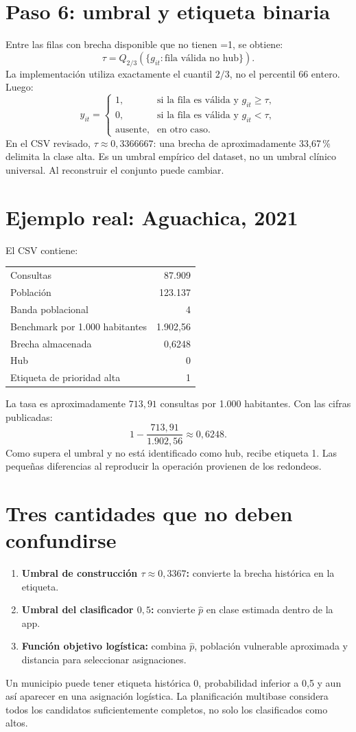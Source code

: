 \documentclass[11pt,a4paper]{report}
\newcommand{\campo}[1]{\texttt{\detokenize{#1}}}
\begin{document}
\section{Paso 6: umbral y etiqueta binaria}
Entre las filas con brecha disponible que no tienen \campo{es_hub}=1, se obtiene:
\[
\tau=Q_{2/3}(\{g_{it}:\text{fila válida no hub}\}).
\]
La implementación utiliza exactamente el cuantil $2/3$, no el percentil 66 entero. Luego:
\[
y_{it}=
\begin{cases}
1,& \text{si la fila es válida y }g_{it}\geq\tau,\\
0,& \text{si la fila es válida y }g_{it}<\tau,\\
\text{ausente},& \text{en otro caso}.
\end{cases}
\]
En el CSV revisado, $\tau\approx0,3366667$: una brecha de aproximadamente 33,67\,\% delimita la clase alta. Es un umbral empírico del dataset, no un umbral clínico universal. Al reconstruir el conjunto puede cambiar.

\section{Ejemplo real: Aguachica, 2021}
El CSV contiene:
\begin{center}
\begin{tabular}{@{}lr@{}}
\toprule
Consultas & 87.909\\
Población & 123.137\\
Banda poblacional & 4\\
Benchmark por 1.000 habitantes & 1.902,56\\
Brecha almacenada & 0,6248\\
Hub & 0\\
Etiqueta de prioridad alta & 1\\
\bottomrule
\end{tabular}
\end{center}
La tasa es aproximadamente $713,91$ consultas por 1.000 habitantes. Con las cifras publicadas:
\[
1-\frac{713,91}{1.902,56}\approx0,6248.
\]
Como supera el umbral y no está identificado como hub, recibe etiqueta 1. Las pequeñas diferencias al reproducir la operación provienen de los redondeos.

\section{Tres cantidades que no deben confundirse}
\begin{enumerate}
\item \textbf{Umbral de construcción $\tau\approx0,3367$:} convierte la brecha histórica en la etiqueta.
\item \textbf{Umbral del clasificador $0,5$:} convierte $\hat p$ en clase estimada dentro de la app.
\item \textbf{Función objetivo logística:} combina $\hat p$, población vulnerable aproximada y distancia para seleccionar asignaciones.
\end{enumerate}
Un municipio puede tener etiqueta histórica 0, probabilidad inferior a 0,5 y aun así aparecer en una asignación logística. La planificación multibase considera todos los candidatos suficientemente completos, no solo los clasificados como altos.
\end{document}
